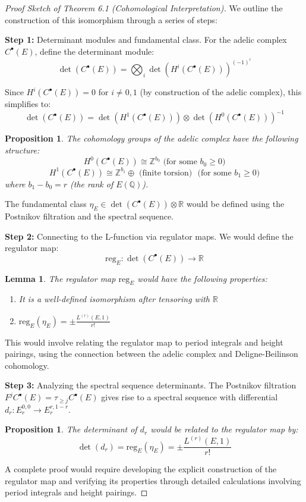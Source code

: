 \documentclass{article}
\theoremstyle{plain}
\newtheorem{proposition}[theorem]{Proposition}
\newtheorem{lemma}[theorem]{Lemma}
\theoremstyle{definition}
\theoremstyle{remark}
\begin{document}
\begin{proof}[Proof Sketch of Theorem 6.1 (Cohomological Interpretation)]
We outline the construction of this isomorphism through a series of steps:
\vspace{.3cm} 

\textbf{Step 1:} Determinant modules and fundamental class.
For the adelic complex $C^\bullet(E)$, define the determinant module:
\[
\det(C^\bullet(E)) = \bigotimes_i \det(H^i(C^\bullet(E)))^{(-1)^i}
\]

Since $H^i(C^\bullet(E)) = 0$ for $i \neq 0, 1$ (by construction of the adelic complex), this simplifies to:
\[
\det(C^\bullet(E)) = \det(H^1(C^\bullet(E))) \otimes \det(H^0(C^\bullet(E)))^{-1}
\]

\begin{proposition}
The cohomology groups of the adelic complex have the following structure:
\[
H^0(C^\bullet(E)) \cong \mathbb{Z}^{b_0} \text{ (for some } b_0 \geq 0\text{)}
\]
\[
H^1(C^\bullet(E)) \cong \mathbb{Z}^{b_1} \oplus \text{ (finite torsion) } \text{ (for some } b_1 \geq 0\text{)}
\]
where $b_1 - b_0 = r$ (the rank of $E(\mathbb{Q})$).
\end{proposition}

The fundamental class $\eta_E \in \det(C^\bullet(E)) \otimes \mathbb{R}$ would be defined using the Postnikov filtration and the spectral sequence.
\vspace{.3cm} 

\textbf{Step 2:} Connecting to the L-function via regulator maps.
We would define the regulator map:
\[
\text{reg}_E : \det(C^\bullet(E)) \to \mathbb{R}
\]

\begin{lemma}
The regulator map $\text{reg}_E$ would have the following properties:
\begin{enumerate}
\item It is a well-defined isomorphism after tensoring with $\mathbb{R}$
\item $\text{reg}_E(\eta_E) = \pm\frac{L^{(r)}(E,1)}{r!}$
\end{enumerate}
\end{lemma}

This would involve relating the regulator map to period integrals and height pairings, using the connection between the adelic complex and Deligne-Beilinson cohomology.
\vspace{.3cm} 

\textbf{Step 3:} Analyzing the spectral sequence determinants.
The Postnikov filtration $F^j C^\bullet(E) = \tau_{\geq j}C^\bullet(E)$ gives rise to a spectral sequence with differential $d_r : E_r^{0,0} \to E_r^{r,1-r}$.

\begin{proposition}
The determinant of $d_r$ would be related to the regulator map by:
\[
\det(d_r) = \text{reg}_E(\eta_E) = \pm\frac{L^{(r)}(E, 1)}{r!}
\]
\end{proposition}

A complete proof would require developing the explicit construction of the regulator map and verifying its properties through detailed calculations involving period integrals and height pairings.
\end{proof}
\end{document}
